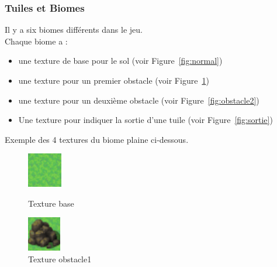 \documentclass[11pt]{article}
\begin{document}
            \subsubsection{Tuiles et Biomes}
            Il y a six biomes différents dans le jeu.\\
            Chaque biome a :
            \begin{itemize}
                \item une texture de base pour le sol (voir Figure~\ref{fig:normal})
                \item une texture pour un premier obstacle (voir Figure~\ref{fig:obstacle1})
                \item une texture pour un deuxième obstacle (voir Figure~\ref{fig:obstacle2})
                \item Une texture pour indiquer la sortie d'une tuile (voir Figure~\ref{fig:sortie})
            \end{itemize}
            Exemple des 4 textures du biome plaine ci-dessous. 
            \begin{figure}[H]
                \centering
                \begin{minipage}{0.45\textwidth}
                    \centering
                    \includegraphics[height=1.5cm]{normal.png}
                    \caption{Texture base}
                    \label{fig:normal}
                \end{minipage}
                \hfill
                \begin{minipage}{0.45\textwidth}
                    \centering
                    \includegraphics[height=1.5cm]{obstacle1.png}
                    \caption{Texture obstacle1}
                    \label{fig:obstacle1}
                \end{minipage}
            \end{figure}
\end{document}
